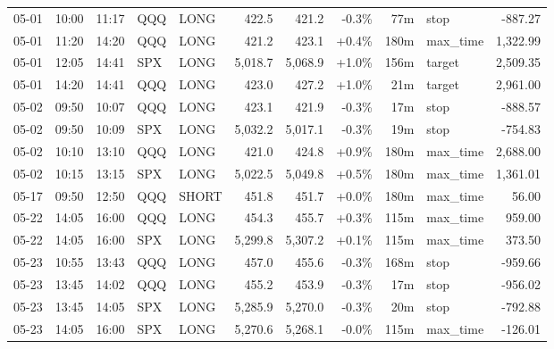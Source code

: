 \documentclass[11pt,a4paper,twoside]{article}
\begin{document}
\begin{center}
\begin{longtable}{>{\color{txtmain}}l l l l l r r r r >{\color{txtmain}}l r}
05-01 & 10:00 & 11:17 & QQQ & LONG & 422.5 & 421.2 & \textcolor{lossred}{-0.3\%} & 77m & stop & \textcolor{lossred}{-887.27} \\
05-01 & 11:20 & 14:20 & QQQ & LONG & 421.2 & 423.1 & \textcolor{wingreen}{+0.4\%} & 180m & max\_time & \textcolor{wingreen}{1,322.99} \\
05-01 & 12:05 & 14:41 & SPX & LONG & 5,018.7 & 5,068.9 & \textcolor{wingreen}{+1.0\%} & 156m & target & \textcolor{wingreen}{2,509.35} \\
05-01 & 14:20 & 14:41 & QQQ & LONG & 423.0 & 427.2 & \textcolor{wingreen}{+1.0\%} & 21m & target & \textcolor{wingreen}{2,961.00} \\
05-02 & 09:50 & 10:07 & QQQ & LONG & 423.1 & 421.9 & \textcolor{lossred}{-0.3\%} & 17m & stop & \textcolor{lossred}{-888.57} \\
05-02 & 09:50 & 10:09 & SPX & LONG & 5,032.2 & 5,017.1 & \textcolor{lossred}{-0.3\%} & 19m & stop & \textcolor{lossred}{-754.83} \\
05-02 & 10:10 & 13:10 & QQQ & LONG & 421.0 & 424.8 & \textcolor{wingreen}{+0.9\%} & 180m & max\_time & \textcolor{wingreen}{2,688.00} \\
05-02 & 10:15 & 13:15 & SPX & LONG & 5,022.5 & 5,049.8 & \textcolor{wingreen}{+0.5\%} & 180m & max\_time & \textcolor{wingreen}{1,361.01} \\
05-17 & 09:50 & 12:50 & QQQ & SHORT & 451.8 & 451.7 & \textcolor{wingreen}{+0.0\%} & 180m & max\_time & \textcolor{wingreen}{56.00} \\
05-22 & 14:05 & 16:00 & QQQ & LONG & 454.3 & 455.7 & \textcolor{wingreen}{+0.3\%} & 115m & max\_time & \textcolor{wingreen}{959.00} \\
05-22 & 14:05 & 16:00 & SPX & LONG & 5,299.8 & 5,307.2 & \textcolor{wingreen}{+0.1\%} & 115m & max\_time & \textcolor{wingreen}{373.50} \\
05-23 & 10:55 & 13:43 & QQQ & LONG & 457.0 & 455.6 & \textcolor{lossred}{-0.3\%} & 168m & stop & \textcolor{lossred}{-959.66} \\
05-23 & 13:45 & 14:02 & QQQ & LONG & 455.2 & 453.9 & \textcolor{lossred}{-0.3\%} & 17m & stop & \textcolor{lossred}{-956.02} \\
05-23 & 13:45 & 14:05 & SPX & LONG & 5,285.9 & 5,270.0 & \textcolor{lossred}{-0.3\%} & 20m & stop & \textcolor{lossred}{-792.88} \\
05-23 & 14:05 & 16:00 & SPX & LONG & 5,270.6 & 5,268.1 & \textcolor{lossred}{-0.0\%} & 115m & max\_time & \textcolor{lossred}{-126.01} \\

\end{longtable}
\end{center}
\end{document}
